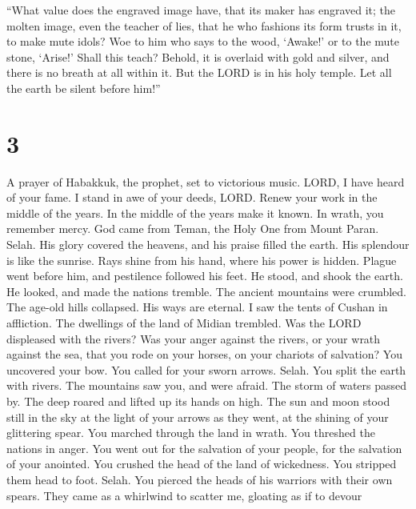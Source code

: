 ``What value does the engraved image have, that its maker
has engraved it; the molten image, even the teacher of lies, that he who
fashions its form trusts in it, to make mute idols?  Woe to
him who says to the wood, `Awake!' or to the mute stone, `Arise!' Shall
this teach? Behold, it is overlaid with gold and silver, and there is no
breath at all within it.  But the LORD is in his holy
temple. Let all the earth be silent before him!''

\hypertarget{section-2}{%
\section{3}\label{section-2}}

 A prayer of Habakkuk, the prophet, set to victorious music.
 LORD, I have heard of your fame. I stand in awe of your
deeds, LORD. Renew your work in the middle of the years. In the middle
of the years make it known. In wrath, you remember mercy. 
God came from Teman, the Holy One from Mount Paran. Selah. His glory
covered the heavens, and his praise filled the earth.  His
splendour is like the sunrise. Rays shine from his hand, where his power
is hidden.  Plague went before him, and pestilence followed
his feet.  He stood, and shook the earth. He looked, and
made the nations tremble. The ancient mountains were crumbled. The
age-old hills collapsed. His ways are eternal.  I saw the
tents of Cushan in affliction. The dwellings of the land of Midian
trembled.  Was the LORD displeased with the rivers? Was your
anger against the rivers, or your wrath against the sea, that you rode
on your horses, on your chariots of salvation?  You
uncovered your bow. You called for your sworn arrows. Selah. You split
the earth with rivers.  The mountains saw you, and were
afraid. The storm of waters passed by. The deep roared and lifted up its
hands on high.  The sun and moon stood still in the sky at
the light of your arrows as they went, at the shining of your glittering
spear.  You marched through the land in wrath. You threshed
the nations in anger.  You went out for the salvation of
your people, for the salvation of your anointed. You crushed the head of
the land of wickedness. You stripped them head to foot. Selah.
 You pierced the heads of his warriors with their own
spears. They came as a whirlwind to scatter me, gloating as if to devour
